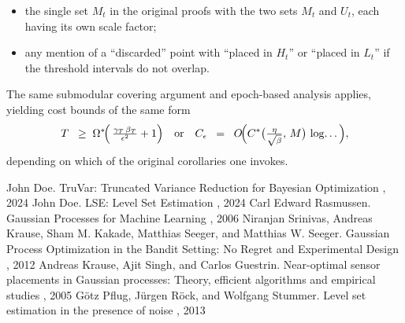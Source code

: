 \documentclass[a4paper,10pt]{article}
\begin{document}
\begin{itemize}
    \item the single set $M_t$ in the original proofs with the two sets $M_t$ and $U_t$, each having its own scale factor;
    \item any mention of a “discarded” point with “placed in \(H_t\)” or “placed in \(L_t\)” if the threshold intervals do not overlap.
\end{itemize}

The same submodular covering argument and epoch-based analysis applies, yielding cost bounds of the same form
\[
   T \;\;\ge\;
   \Omega^*\!\Bigl(\,\tfrac{\gamma_T\,\beta_T}{\epsilon^2} + 1\Bigr)
   \quad\text{or}\quad
   C_\epsilon \;\;=\;\; O\!\Bigl(
     C^*\bigl(\tfrac{\eta}{\sqrt{\beta}},\,M\bigr)\,\log\!\dots
   \Bigr),
\]
depending on which of the original corollaries one invokes.




\begin{thebibliography}{99}
    John Doe.
    \newblock TruVar: Truncated Variance Reduction for Bayesian Optimization
    , 2024
    John Doe.
    \newblock LSE: Level Set Estimation
    , 2024
    Carl Edward Rasmussen.
    \newblock Gaussian Processes for Machine Learning
    , 2006
    Niranjan Srinivas, Andreas Krause, Sham M. Kakade, Matthias Seeger, and Matthias W. Seeger.
    \newblock Gaussian Process Optimization in the Bandit Setting: No Regret and Experimental Design
    , 2012
    Andreas Krause, Ajit Singh, and Carlos Guestrin.
    \newblock Near-optimal sensor placements in Gaussian processes: Theory, efficient algorithms and empirical studies
    , 2005
    G\"otz Pflug, J\"urgen R\"ock, and Wolfgang Stummer.
    \newblock Level set estimation in the presence of noise
    , 2013
\end{thebibliography}
\end{document}
